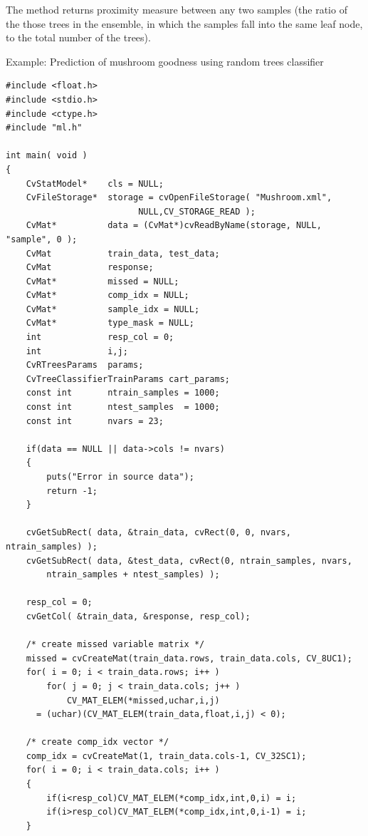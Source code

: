 
The method returns proximity measure between any two samples (the ratio of the those trees in the ensemble, in which the samples fall into the same leaf node, to the total number of the trees).


Example: Prediction of mushroom goodness using random trees classifier

\begin{lstlisting}
#include <float.h>
#include <stdio.h>
#include <ctype.h>
#include "ml.h"

int main( void )
{
    CvStatModel*    cls = NULL;
    CvFileStorage*  storage = cvOpenFileStorage( "Mushroom.xml", 
						  NULL,CV_STORAGE_READ );
    CvMat*          data = (CvMat*)cvReadByName(storage, NULL, "sample", 0 );
    CvMat           train_data, test_data;
    CvMat           response;
    CvMat*          missed = NULL;
    CvMat*          comp_idx = NULL;
    CvMat*          sample_idx = NULL;
    CvMat*          type_mask = NULL;
    int             resp_col = 0;
    int             i,j;
    CvRTreesParams  params;
    CvTreeClassifierTrainParams cart_params;
    const int       ntrain_samples = 1000;
    const int       ntest_samples  = 1000;
    const int       nvars = 23;

    if(data == NULL || data->cols != nvars)
    {
        puts("Error in source data");
        return -1;
    }

    cvGetSubRect( data, &train_data, cvRect(0, 0, nvars, ntrain_samples) );
    cvGetSubRect( data, &test_data, cvRect(0, ntrain_samples, nvars,
        ntrain_samples + ntest_samples) );

    resp_col = 0;
    cvGetCol( &train_data, &response, resp_col);

    /* create missed variable matrix */
    missed = cvCreateMat(train_data.rows, train_data.cols, CV_8UC1);
    for( i = 0; i < train_data.rows; i++ )
        for( j = 0; j < train_data.cols; j++ )
            CV_MAT_ELEM(*missed,uchar,i,j)  
	  = (uchar)(CV_MAT_ELEM(train_data,float,i,j) < 0);

    /* create comp_idx vector */
    comp_idx = cvCreateMat(1, train_data.cols-1, CV_32SC1);
    for( i = 0; i < train_data.cols; i++ )
    {
        if(i<resp_col)CV_MAT_ELEM(*comp_idx,int,0,i) = i;
        if(i>resp_col)CV_MAT_ELEM(*comp_idx,int,0,i-1) = i;
    }


\end{lstlisting}
